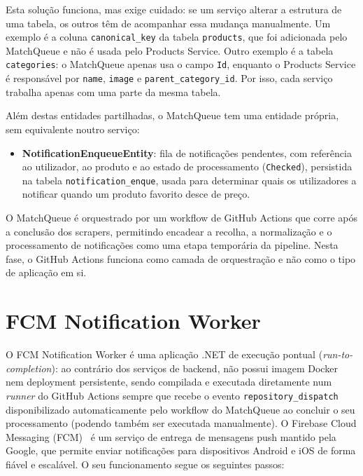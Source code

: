 Esta solução funciona, mas exige cuidado: se um serviço alterar a estrutura de uma tabela, os outros têm de acompanhar essa mudança manualmente. Um exemplo é a coluna \texttt{canonical\_key} da tabela \texttt{products}, que foi adicionada pelo MatchQueue e não é usada pelo Products Service. Outro exemplo é a tabela \texttt{categories}: o MatchQueue apenas usa o campo \texttt{Id}, enquanto o Products Service é responsável por \texttt{name}, \texttt{image} e \texttt{parent\_category\_id}. Por isso, cada serviço trabalha apenas com uma parte da mesma tabela.

Além destas entidades partilhadas, o MatchQueue tem uma entidade própria, sem equivalente noutro serviço:
\begin{itemize}
    \item \textbf{NotificationEnqueueEntity}: fila de notificações pendentes, com referência ao utilizador, ao produto e ao estado de processamento (\texttt{Checked}), persistida na tabela \texttt{notification\_enque}, usada para determinar quais os utilizadores a notificar quando um produto favorito desce de preço.
\end{itemize}
O MatchQueue é orquestrado por um workflow de GitHub Actions que corre após a conclusão dos scrapers, permitindo encadear a recolha, a normalização e o processamento de notificações como uma etapa temporária da pipeline. Nesta fase, o GitHub Actions funciona como camada de orquestração e não como o tipo de aplicação em si.

\section{FCM Notification Worker}
\label{sec:4.4}

O FCM Notification Worker é uma aplicação .NET de execução pontual (\textit{run-to-completion}): ao contrário dos serviços de backend, não possui imagem Docker nem deployment persistente, sendo compilada e executada diretamente num \textit{runner} do GitHub Actions sempre que recebe o evento \texttt{repository\_dispatch} disponibilizado automaticamente pelo workflow do MatchQueue ao concluir o seu processamento (podendo também ser executada manualmente). O Firebase Cloud Messaging (\ac{FCM})~\cite{firebase-fcm} é um serviço de entrega de mensagens push mantido pela Google, que permite enviar notificações para dispositivos Android e iOS de forma fiável e escalável. O seu funcionamento segue os seguintes passos:

